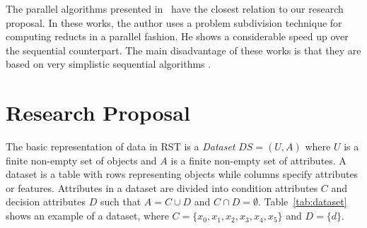 \documentclass[citenumber]{elsarticle}
\renewcommand{\algorithmicrequire}{\textbf{Input:}}
\renewcommand{\algorithmicensure}{\textbf{Output:}}
\begin{document}
	The parallel algorithms presented in~\cite{Susmaga1998,Susmaga2004} have the closest relation to our research proposal. In these works, the author uses a problem subdivision technique for computing reducts in a parallel fashion. He shows a considerable speed up over the sequential counterpart. The main disadvantage of these works is that they are based on very simplistic sequential algorithms \cite{Skowron92,susmaga1998effective}. 
%
\section{Research Proposal}\label{Proposal} 
%    
	The basic representation of data in RST is a \emph{Dataset} $DS=(U,A)$ where $U$ is a finite non-empty set of objects and $A$ is a finite non-empty set of attributes. A dataset is a table with rows representing objects while columns specify attributes or features. Attributes in a dataset are divided into condition attributes $C$ and decision attributes $D$ such that $A=C \cup D$ and $C \cap D =\emptyset$. Table~\ref{tab:dataset} shows an example of a dataset, where $C=\lbrace x_0,x_1,x_2,x_3,x_4,x_5 \rbrace$ and $D=\lbrace d \rbrace$.

%			
	
\end{document}
